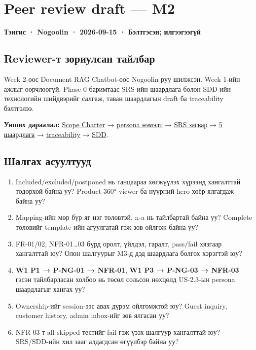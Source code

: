 \section{Peer review draft --- M2}\label{doc7-peer-review-draft-m2}

\textbf{Тэнгис · Nogoolin · 2026-09-15 · Бэлтгэсэн; илгээгээгүй}

\subsection{Reviewer-т зориулсан
тайлбар}\label{doc7-reviewer-ux442-ux437ux43eux440ux438ux443ux43bux441ux430ux43d-ux442ux430ux439ux43bux431ux430ux440}

Week 2-оос Document RAG Chatbot-оос Nogoolin руу шилжсэн. Week 1-ийн
ажлыг өөрчлөөгүй. Phase 0 баримтаас SRS-ийн шаардлага болон SDD-ийн
технологийн шийдвэрийг салгаж, таван шаардлагын draft ба traceability
бэлтгэлээ.

\textbf{Унших дараалал:}
\href{../../requirements/scope-charter.md}{Scope Charter} →
\href{wiki/persona-and-pivot.md}{persona нэмэлт} →
\href{../../requirements/srs-template.md}{SRS загвар} →
\href{../../requirements/requirements.md}{5 шаардлага} →
\href{../../requirements/traceability-matrix.md}{traceability} →
\href{../../architecture/sdd-template.md}{SDD}.

\subsection{Шалгах
асуултууд}\label{doc7-ux448ux430ux43bux433ux430ux445-ux430ux441ux443ux443ux43bux442ux443ux443ux434}

\begin{enumerate}
\def\labelenumi{\arabic{enumi}.}
\tightlist
\item
  Included/excluded/postponed нь ганцаараа хөгжүүлэх хүрээнд хангалттай
  тодорхой байна уу? Product 360° viewer ба нүүрний hero хоёр ялгагдаж
  байна уу?
\item
  Mapping-ийн мөр бүр яг нэг төлөвтэй, n-a нь тайлбартай байна уу?
  Complete төлөвийг template-ийн агуулгатай гэж зөв ойлгож байна уу?
\item
  FR-01/02, NFR-01\ldots03 бүрд оролт, үйлдэл, гаралт, pass/fail хязгаар
  хангалттай юу? Олон шалгуурыг M3-д дэд шаардлага болгох хэрэгтэй юу?
\item
  \textbf{W1 P1 → P-NG-01 → NFR-01}, \textbf{W1 P3 → P-NG-03 → NFR-03}
  гэсэн тайлбарласан холбоо нь төсөл сольсон нөхцөлд US-2.3-ын persona
  шаардлагыг хангах уу?
\item
  Ownership-ийг session-ээс авах дүрэм ойлгомжтой юу? Guest inquiry,
  customer history, admin inbox-ийг зөв ялгасан уу?
\item
  NFR-03-т all-skipped тестийг fail гэж үзэх шалгуур хангалттай юу?
  SRS/SDD-ийн хил зааг алдагдсан өгүүлбэр байна уу?
\end{enumerate}


